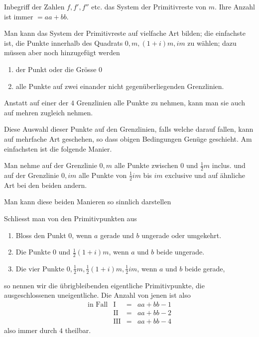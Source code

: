 %
Inbegriff der Zahlen $f,f',f''$ etc. das System der Primitivreste von $m$. Ihre Anzahl ist immer $=aa+bb$.

Man kann das System der Primitivreste auf vielfache Art bilden; die einfachste ist, die Punkte innerhalb des Quadrats $0,m,(1+i)m,im$ zu wählen; dazu müssen aber noch hinzugefügt werden
\begin{enumerate}
\item[I.] der Punkt oder die Grösse $0$
\item[II.] alle Punkte auf zwei einander nicht gegenüberliegenden Grenzlinien.
\end{enumerate}
Anstatt auf einer der $4$ Grenzlinien alle Punkte zu nehmen, kann man sie auch auf mehren zugleich nehmen.

Diese Auswahl dieser Punkte auf den Grenzlinien, falls welche darauf fallen, kann auf mehrfache Art geschehen, so dass obigen Bedingungen Genüge geschieht. Am einfachsten ist die folgende Manier.

Man nehme auf der Grenzlinie $0,m$ alle Punkte zwischen $0$ und $\frac12m$ inclus. und auf der Grenzlinie $0,im$ alle Punkte von $\frac12im$ bis $im$ exclusive und auf ähnliche Art bei den beiden andern.

Man kann diese beiden Manieren so sinnlich darstellen
\begin{center}\resizebox{.85\textwidth}{!}{}\end{center}

Schliesst man von den Primitivpunkten aus
\begin{enumerate}
\item[I.] Bloss den Punkt $0$, wenn $a$ gerade und $b$ ungerade oder umgekehrt.
\item[II.] Die Punkte $0$ und $\frac12(1+i)m$, wenn $a$ und $b$ beide ungerade.
\item[III.] Die vier Punkte $0,\frac12m,\frac12(1+i)m,\frac12im$, wenn $a$ und $b$ beide gerade,
\end{enumerate}
so nennen wir die übrigbleibenden eigentliche Primitivpunkte, die ausgeschlossenen uneigentliche. Die Anzahl von jenen ist also
\[
\begin{array}{rrcl}
\text{in Fall}&\mathrm{I}&=&aa+bb-1\\
&\mathrm{II}&=&aa+bb-2\\
&\mathrm{III}&=&aa+bb-4
\end{array}
\]
also immer durch $4$ theilbar.

